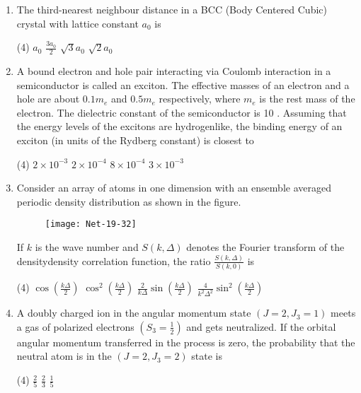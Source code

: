 \begin{enumerate}
\item The third-nearest neighbour distance in a BCC (Body Centered Cubic) crystal with lattice constant $a_{0}$ is
 \begin{tasks}(4)
	\task[\textbf{a.}] $a_{0}$
	\task[\textbf{b.}]$\frac{3 a_{0}}{2}$
	\task[\textbf{c.}] $\sqrt{3} a_{0}$
	\task[\textbf{d.}]  $\sqrt{2} a_{0}$
\end{tasks}
\item A bound electron and hole pair interacting via Coulomb interaction in a semiconductor is called an exciton. The effective masses of an electron and a hole are about $0.1 m_{e}$ and $0.5 m_{e}$ respectively, where $m_{e}$ is the rest mass of the electron. The dielectric constant of the semiconductor is 10 . Assuming that the energy levels of the excitons are hydrogenlike, the binding energy of an exciton (in units of the Rydberg constant) is closest to
 \begin{tasks}(4)
	\task[\textbf{a.}]$2 \times 10^{-3}$
	\task[\textbf{b.}]$2 \times 10^{-4}$
	\task[\textbf{c.}]$8 \times 10^{-4}$
	\task[\textbf{d.}]$3 \times 10^{-3}$ 
\end{tasks}
\item Consider an array of atoms in one dimension with an ensemble averaged periodic density distribution as shown in the figure.
\begin{figure}[H]
	\centering
	\texttt{[image: Net-19-32]}
\end{figure}
If $k$ is the wave number and $S(k, \Delta)$ denotes the Fourier transform of the densitydensity correlation function, the ratio $\frac{S(k, \Delta)}{S(k, 0)}$ is
 \begin{tasks}(4)
	\task[\textbf{a.}] $\cos \left(\frac{k \Delta}{2}\right)$
	\task[\textbf{b.}] $\cos ^{2}\left(\frac{k \Delta}{2}\right)$
	\task[\textbf{c.}] $\frac{2}{k \Delta} \sin \left(\frac{k \Delta}{2}\right)$
	\task[\textbf{d.}] $\frac{4}{k^{2} \Delta^{2}} \sin ^{2}\left(\frac{k \Delta}{2}\right)$
\end{tasks}
\item A doubly charged ion in the angular momentum state $\left(J=2, J_{3}=1\right)$ meets a gas of polarized electrons $\left(S_{3}=\frac{1}{2}\right)$ and gets neutralized. If the orbital angular momentum transferred in the process is zero, the probability that the neutral atom is in the $\left(J=2, J_{3}=2\right)$ state is
 \begin{tasks}(4)
	\task[\textbf{a.}] $\frac{2}{5}$
	\task[\textbf{b.}]$\frac{2}{3}$
	\task[\textbf{c.}]$\frac{1}{5}$

\end{tasks}
\end{enumerate}
